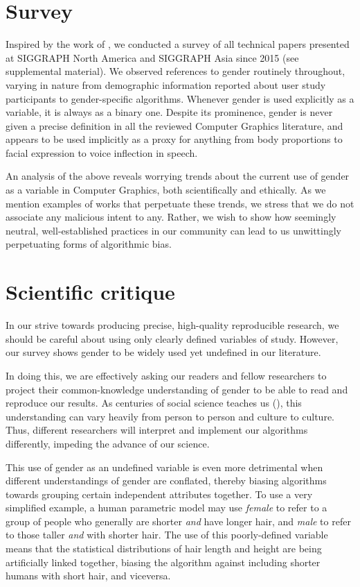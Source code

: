 \documentclass[sigconf,review,balance=false]{acmart}
\begin{document}
\section{Survey}

Inspired by the work of \citet{keyes2018misgendering}, we conducted a survey of
all technical papers presented at SIGGRAPH North America and SIGGRAPH Asia since
2015 (see supplemental material). We observed references to gender routinely
throughout, varying in nature from demographic information reported about user
study participants to gender-specific algorithms. Whenever gender is used
explicitly as a variable, it is always as a binary one. Despite its prominence,
gender is never given a precise definition in all the reviewed Computer Graphics
literature, and appears to be used implicitly as a proxy for anything from body
proportions to facial expression to voice inflection in speech.

An analysis of the above reveals worrying trends about the current use of gender
as a variable in Computer Graphics, both scientifically and ethically. As we
mention examples of works that perpetuate these trends, we stress that we do not
associate any malicious intent to any. Rather, we wish to show how seemingly
neutral, well-established practices in our community can lead to us unwittingly
perpetuating forms of algorithmic bias.

\section{Scientific critique}

In our strive towards producing precise, high-quality reproducible research, we
should be careful about using only clearly defined variables of study. However,
our survey shows gender to be widely used yet undefined in our literature.

In doing this, we are effectively asking our readers and fellow researchers to
project their common-knowledge understanding of gender to be able to read and
reproduce our results. As centuries of social science teaches us
(), this understanding can vary heavily from person
to person and culture to culture. Thus, different researchers will interpret and
implement our algorithms differently, impeding the advance of our science.

This use of gender as an undefined variable is even more detrimental when
different understandings of gender are conflated, thereby biasing algorithms
towards grouping certain independent attributes together. To use a very
simplified example, a human parametric model may use \emph{female} to refer to a
group of people who generally are shorter \emph{and} have longer hair, and
\emph{male} to refer to those taller \emph{and} with shorter hair. The use of
this poorly-defined variable means that the statistical distributions of hair
length and height are being artificially linked together, biasing the algorithm
against including shorter humans with short hair, and viceversa.
\end{document}
